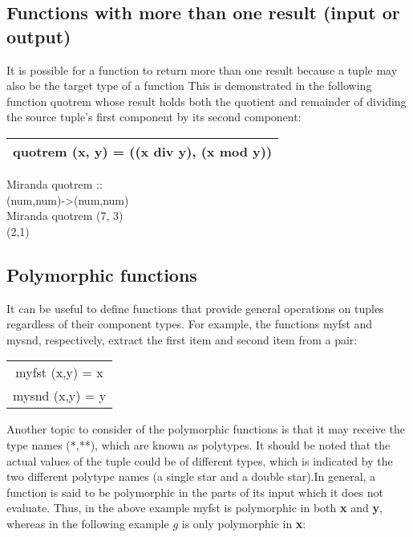 \documentclass[11pt]{article}
\begin{document}
\subsection{Functions with more than one result (input or output)}

It is possible for a function to return more than one result because a tuple may also
be the target type of a function This is demonstrated in the following function
quotrem  whose result holds both the quotient and remainder
of dividing the source tuple’s first component by its second component:

\begin{center}
\begin{tabular}{|c|}
\hline
quotrem (x, y) = ((x div y), (x mod y))\\
\hline
\end{tabular}    
\end{center}

\begin{tcolorbox}
Miranda quotrem ::\\
(num,num)->(num,num)\\
Miranda quotrem (7, 3)\\
(2,1)
\end{tcolorbox}

\subsection{Polymorphic functions}

It can be useful to define functions that provide general operations on tuples regardless
of their component types. For example, the functions myfst and mysnd,
respectively, extract the first item and second item from a pair:
\begin{center}
    

\begin{tabular}{|c|}
\hline
myfst (x,y) = x\\
mysnd (x,y) = y\\
\hline

\end{tabular}
\end{center}

Another topic to consider of the polymorphic functions is that it may receive the type names (*,**), which are known as polytypes. It should be noted that the
actual values of the tuple could be of different types, which is indicated by the two
different polytype names (a single star and a double star).In general, a function is said
to be polymorphic in the parts of its input which it does not evaluate. Thus, in
the above example myfst is polymorphic in both \textbf{x} and \textbf{y}, whereas in the following
example $g$ is only polymorphic in \textbf{x}:
\end{document}
